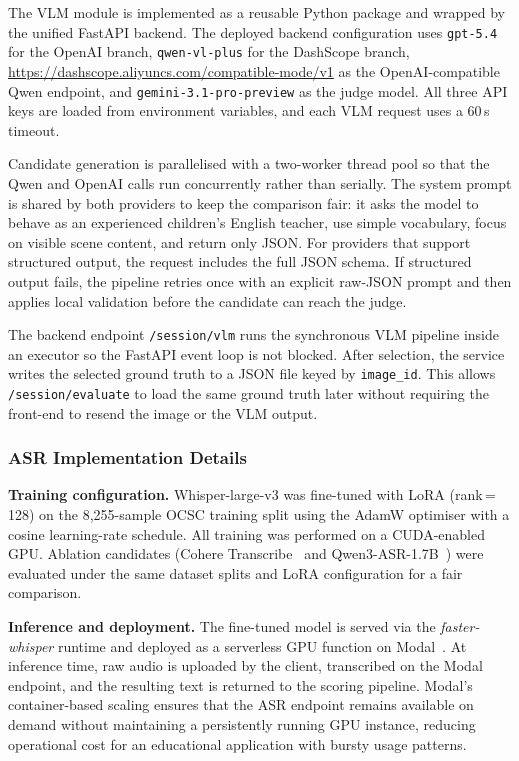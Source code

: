 \documentclass{article}
\begin{document}
The VLM module is implemented as a reusable Python package and wrapped
by the unified FastAPI backend. The deployed backend configuration uses
\texttt{gpt-5.4} for the OpenAI branch, \texttt{qwen-vl-plus} for the
DashScope branch, \url{https://dashscope.aliyuncs.com/compatible-mode/v1}
as the OpenAI-compatible Qwen endpoint, and \texttt{gemini-3.1-pro-preview}
as the judge model. All three API keys are loaded from environment
variables, and each VLM request uses a 60\,s timeout.

Candidate generation is parallelised with a two-worker thread pool so
that the Qwen and OpenAI calls run concurrently rather than serially.
The system prompt is shared by both providers to keep the comparison
fair: it asks the model to behave as an experienced children's English
teacher, use simple vocabulary, focus on visible scene content, and
return only JSON. For providers that support structured output, the
request includes the full JSON schema. If structured output fails, the
pipeline retries once with an explicit raw-JSON prompt and then applies
local validation before the candidate can reach the judge.

The backend endpoint \texttt{/session/vlm} runs the synchronous VLM
pipeline inside an executor so the FastAPI event loop is not blocked.
After selection, the service writes the selected ground truth to a
JSON file keyed by \texttt{image\_id}. This allows
\texttt{/session/evaluate} to load the same ground truth later without
requiring the front-end to resend the image or the VLM output.

\subsubsection{ASR Implementation Details}
\label{sec:asr-impl}
 
\noindent\textbf{Training configuration.}
Whisper-large-v3 was fine-tuned with LoRA (rank\,=\,128) on the
8{,}255-sample OCSC training split using the AdamW optimiser with a
cosine learning-rate schedule.
All training was performed on a CUDA-enabled GPU.
Ablation candidates (Cohere Transcribe~\cite{cohere2026} and
Qwen3-ASR-1.7B~\cite{qwen2025}) were evaluated under the same dataset
splits and LoRA configuration for a fair comparison.
 
\noindent\textbf{Inference and deployment.}
The fine-tuned model is served via the \textit{faster-whisper} runtime
and deployed as a serverless GPU function on Modal~\cite{modal2024}.
At inference time, raw audio is uploaded by the client, transcribed
on the Modal endpoint, and the resulting text is returned to the
scoring pipeline.
Modal's container-based scaling ensures that the ASR endpoint remains
available on demand without maintaining a persistently running GPU
instance, reducing operational cost for an educational application
with bursty usage patterns.
\end{document}
